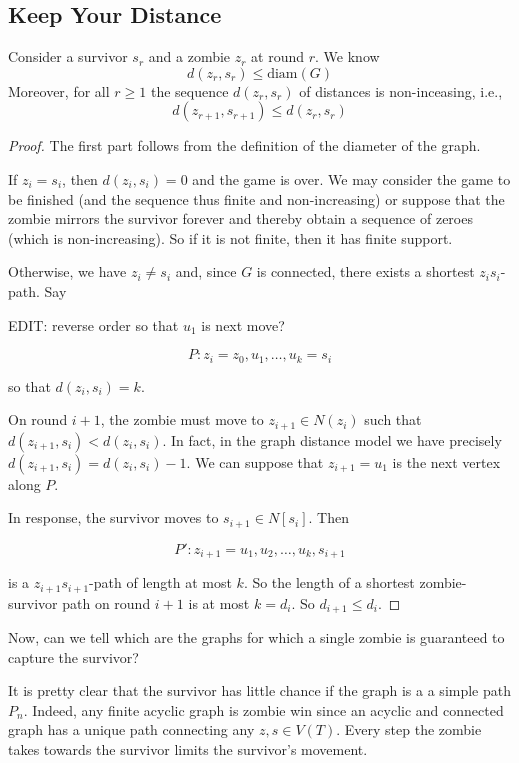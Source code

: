 \subsection{Keep Your Distance}

  Consider a survivor $s_r$ and a zombie $z_r$ at round $r$.
  We know
  \[d(z_r, s_r) \leq \text{diam}(G) \]
  Moreover, for all $r \geq 1$ the sequence $d(z_r, s_r)$ of distances is non-inceasing, i.e.,
  \[ d(z_{r+1}, s_{r+1}) \leq d(z_r, s_r)\]

\begin{proof}
The first part follows from the definition of the diameter of the graph.

If $z_i = s_i$, then $d(z_i, s_i) = 0$ and the game is over. We may consider the
game to be finished (and the sequence thus finite and non-increasing)
or suppose that the zombie mirrors the survivor forever and thereby obtain a sequence
of zeroes (which is non-increasing). So if it is not finite, then it has finite support.

Otherwise, we have $z_i \not= s_i$ and, since $G$ is connected, there exists a shortest $z_is_i$-path. Say

EDIT: reverse order so that $u_1$ is next move?

\[ P : z_i = z_0, u_1, \dots, u_k = s_i \]

so that $d(z_i, s_i) = k$.

On round $i+1$, the zombie must move to $z_{i+1} \in N(z_i)$ such that $d(z_{i+1}, s_i) < d(z_i, s_i)$.
In fact, in the graph distance model we have precisely $d(z_{i+1}, s_i) = d(z_i, s_i) - 1$.
We can suppose that $z_{i+1} = u_1$ is the next vertex along $P$.

In response, the survivor moves to $s_{i+1} \in N[s_i]$. Then

\[ P' : z_{i+1} = u_1, u_2, \dots, u_k, s_{i+1} \]

is a $z_{i+1}s_{i+1}$-path of length at most $k$. So the length of a shortest zombie-survivor
path on round $i+1$ is at most $k = d_i$. So $d_{i+1} \leq d_i$.
\end{proof}

Now, can we tell which are the graphs for which a single zombie is guaranteed to capture the
survivor?

It is pretty clear that the survivor has little chance if the graph is a
a simple path $P_n$.
Indeed, any finite acyclic graph is zombie win since an acyclic and connected graph
has a unique path connecting any $z, s \in V(T)$. Every step the zombie takes towards
the survivor limits the survivor's movement.

